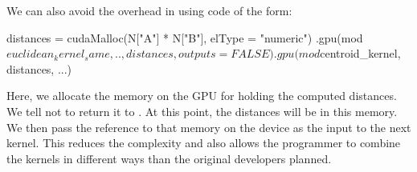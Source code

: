 We can also avoid the overhead in  using 
code of the form:
\begin{RCode}
distances = cudaMalloc(N["A"] * N["B"], elType = "numeric")
.gpu(mod$euclidean_kernel_same, .., distances, outputs = FALSE)
.gpu(mod$centroid_kernel, distances, ...) 
\end{RCode}
Here, we allocate the memory on the GPU for holding the computed
distances. We tell  not to return it to \R.
At this point, the distances will be in this memory.
We then pass the reference to that memory on the device as the input
to the next kernel. 
This reduces the complexity and also allows the \R{} programmer
to combine the kernels in different ways than the original
developers planned.




